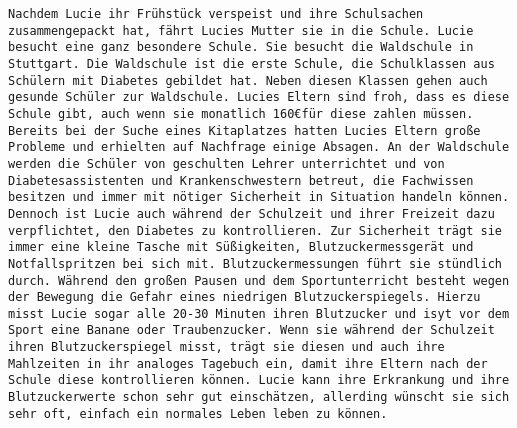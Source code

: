 		\texttt{Nachdem Lucie ihr Frühstück verspeist und ihre Schulsachen \newline
			zusammengepackt hat, fährt Lucies Mutter sie in die Schule. \newline
			Lucie besucht eine ganz besondere Schule. Sie besucht die Waldschule \newline
			in Stuttgart. Die Waldschule ist die erste Schule, die Schulklassen aus \newline
			Schülern mit Diabetes gebildet hat. Neben diesen Klassen gehen auch \newline
			gesunde Schüler zur Waldschule. Lucies Eltern sind froh, dass es diese \newline
			 Schule gibt, auch wenn sie monatlich 160\euro für diese zahlen  müssen. \newline
			 Bereits bei der Suche eines Kitaplatzes hatten Lucies Eltern große \newline
			 Probleme und erhielten auf Nachfrage einige Absagen. An der Waldschule \newline
			 werden die Schüler von geschulten Lehrer unterrichtet und von \newline
			 Diabetesassistenten und Krankenschwestern betreut, die Fachwissen\newline
			  besitzen und immer mit nötiger Sicherheit in Situation handeln können. \newline
			  Dennoch ist Lucie auch während der Schulzeit und ihrer Freizeit \newline
			  dazu verpflichtet, den Diabetes zu kontrollieren. Zur Sicherheit trägt sie \newline
			  immer eine kleine Tasche mit Süßigkeiten, Blutzuckermessgerät\newline
			   und Notfallspritzen bei sich mit. Blutzuckermessungen  führt sie \newline
			   stündlich durch. Während den großen Pausen und dem Sportunterricht besteht \newline
			   wegen der Bewegung die Gefahr eines niedrigen Blutzuckerspiegels. Hierzu \newline
			   misst Lucie sogar alle 20-30 Minuten ihren Blutzucker und isyt vor dem Sport \newline
			   eine Banane oder Traubenzucker. Wenn sie während der Schulzeit ihren \newline
			   Blutzuckerspiegel misst, trägt sie diesen und auch ihre Mahlzeiten in ihr \newline
			   analoges Tagebuch ein, damit ihre Eltern nach der Schule diese kontrollieren können.\newline
			    Lucie kann ihre Erkrankung und ihre Blutzuckerwerte schon sehr gut \newline
			    einschätzen, allerding wünscht sie sich sehr oft, einfach ein normales \newline
			    Leben leben zu können. }\\
		    
